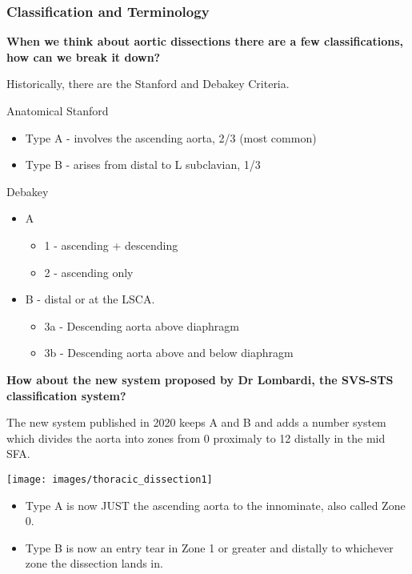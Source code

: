 \documentclass[
]{book}
\begin{document}
\hypertarget{classification-and-terminology}{%
\subsubsection{Classification and Terminology}\label{classification-and-terminology}}

\textbf{When we think about aortic dissections there are a few
classifications, how can we break it down?}

Historically, there are the Stanford and Debakey Criteria.

Anatomical Stanford

\begin{itemize}
\item
  Type A - involves the ascending aorta, 2/3 (most common)
\item
  Type B - arises from distal to L subclavian, 1/3
\end{itemize}

Debakey

\begin{itemize}
\item
  A

  \begin{itemize}
  \item
    1 - ascending + descending
  \item
    2 - ascending only
  \end{itemize}
\item
  B - distal or at the LSCA.

  \begin{itemize}
  \item
    3a - Descending aorta above diaphragm
  \item
    3b - Descending aorta above and below diaphragm
  \end{itemize}
\end{itemize}

\textbf{How about the new system proposed by Dr Lombardi, the SVS-STS
classification system?}

The new system published in 2020 keeps A and B and adds a number system
which divides the aorta into zones from 0 proximaly to 12 distally in
the mid SFA. \citep{lombardiSocietyVascularSurgery2020}

\texttt{[image: images/thoracic\_dissection1]}

\begin{itemize}
\item
  Type A is now JUST the ascending aorta to the innominate, also
  called Zone 0.
\item
  Type B is now an entry tear in Zone 1 or greater and distally to
  whichever zone the dissection lands in.
\end{itemize}
\end{document}
